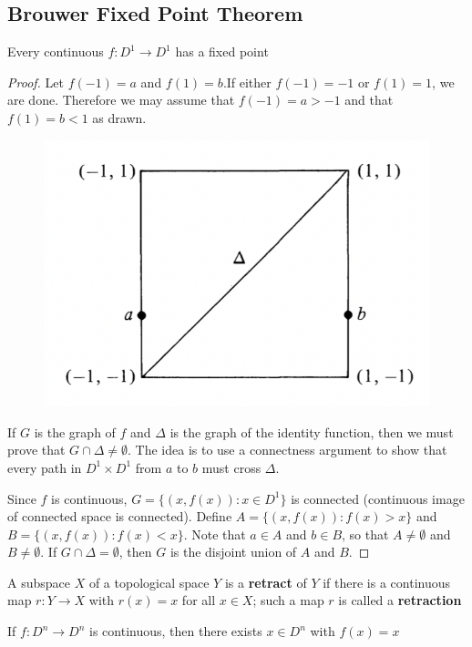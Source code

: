 \documentclass[11pt]{article}
\begin{document}
\subsection{Brouwer Fixed Point Theorem}
\label{sec:org3ea279d}
\begin{theorem}[]
Every continuous \(f:D^1\to D^1\) has a fixed point
\end{theorem}

\begin{proof}
Let \(f(-1)=a\) and \(f(1)=b\).If either \(f(-1)=-1\) or \(f(1)=1\), we are done. Therefore we
may assume that \(f(-1)=a>-1\) and that \(f(1)=b<1\) as drawn.
\begin{figure}[htbp]
\centering
\includegraphics[width=.5\textwidth]{../images/AnIntroductionToAlgebraicTopology/1.png}
\label{}
\end{figure}
If \(G\) is the graph of \(f\) and \(\Delta\) is the graph of the identity function, then we must prove
that \(G\cap\Delta\neq\emptyset\). The idea is to use a connectness argument to show that every path in \(D^1\times D^1\)
from \(a\) to \(b\) must cross \(\Delta\).

Since \(f\) is continuous, \(G=\{(x,f(x)):x\in D^1\}\) is connected (continuous image of connected
space is connected). Define \(A=\{(x,f(x)):f(x)>x\}\)  and \(B=\{(x,f(x)):f(x)<x\}\). Note
that \(a\in A\) and \(b\in B\), so that \(A\neq\emptyset\) and \(B\neq\emptyset\). If \(G\cap\Delta=\emptyset\), then \(G\) is the disjoint
union of \(A\) and \(B\).
\end{proof}

\begin{definition}[]
A subspace \(X\) of a topological space \(Y\) is a \textbf{retract} of \(Y\) if there is a continuous
map  \(r:Y\to X\) with \(r(x)=x\) for all \(x\in X\); such a map \(r\) is called a \textbf{retraction}
\end{definition}



\begin{theorem}
If \(f:D^n\to D^n\) is continuous, then there exists \(x\in D^n\) with \(f(x)=x\)
\end{theorem}
\end{document}
